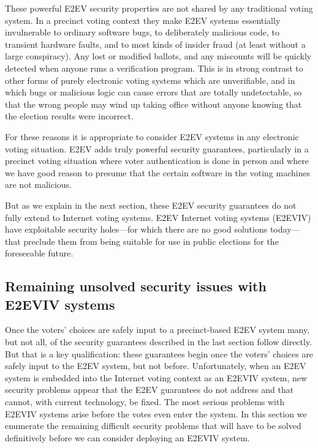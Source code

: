 These powerful E2EV security properties are not shared by any
traditional voting system. In a precinct voting context they make E2EV
systems essentially invulnerable to ordinary software bugs, to
deliberately malicious code, to transient hardware faults, and to most
kinds of insider fraud (at least without a large conspiracy). Any lost
or modified ballots, and any miscounts will be quickly detected when
anyone runs a verification program. This is in strong contrast to
other forms of purely electronic voting systems which are
unverifiable, and in which bugs or malicious logic can cause errors
that are totally undetectable, so that the wrong people may wind up
taking office without anyone knowing that the election results were
incorrect.

For these reasons it is appropriate to consider E2EV systems in any
electronic voting situation. E2EV adds truly powerful security
guarantees, particularly in a precinct voting situation where voter
authentication is done in person and where we have good reason to
presume that the certain software in the voting machines are not
malicious.

But as we explain in the next section, these E2EV security guarantees
do not fully extend to Internet voting systems. E2EV Internet voting
systems (E2EVIV) have exploitable security holes---for which there are
no good solutions today---that preclude them from being suitable for
use in public elections for the foreseeable future.
  
\subsection{Remaining unsolved security issues with E2EVIV systems}

Once the voters' choices are safely input to a precinct-based E2EV
system many, but not all, of the security guarantees described in the
last section follow directly. But that is a key qualification: these
guarantees begin once the voters' choices are safely input to the E2EV
system, but not before. Unfortunately, when an E2EV system is embedded
into the Internet voting context as an E2EVIV system, new security
problems appear that the E2EV guarantees do not address and that
cannot, with current technology, be fixed. The most serious problems
with E2EVIV systems arise before the votes even enter the system. In
this section we enumerate the remaining difficult security problems
that will have to be solved definitively before we can consider
deploying an E2EVIV system.

